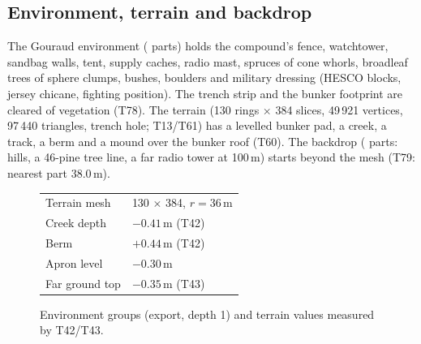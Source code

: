 \subsection{Environment, terrain and backdrop}
The Gouraud environment (\partsEnv{} parts) holds the compound's fence, watchtower, sandbag walls, tent, supply caches, radio mast,
spruces of cone whorls, broadleaf trees of sphere clumps, bushes, boulders and military dressing (HESCO blocks, jersey chicane, fighting position). The trench strip and the bunker
footprint are cleared of vegetation (T78). The terrain (130 rings $\times$ 384 slices, 49\,921
vertices, 97\,440 triangles, trench hole; T13/T61) has a levelled bunker pad,
a creek, a track, a berm and a mound over the bunker roof (T60). The backdrop (\partsBackdrop{} parts:
hills, a 46-pine tree line, a far radio tower at 100\,m) starts beyond the mesh (T79: nearest part 38.0\,m).

\begin{figure}[h]
\centering
\begin{minipage}[t]{0.6\linewidth}\vspace{0pt}\end{minipage}\hfill
\begin{minipage}[t]{0.36\linewidth}\vspace{0pt}\footnotesize
\begin{tabular}{@{}ll@{}}\toprule
Terrain mesh & 130 $\times$ 384, $r=36$\,m\\
Creek depth & $-0.41$\,m (T42)\\
Berm & $+0.44$\,m (T42)\\
Apron level & $-0.30$\,m\\
Far ground top & $-0.35$\,m (T43)\\\bottomrule
\end{tabular}
\end{minipage}
\caption{Environment groups (export, depth 1) and terrain values measured by T42/T43.}
\end{figure}
